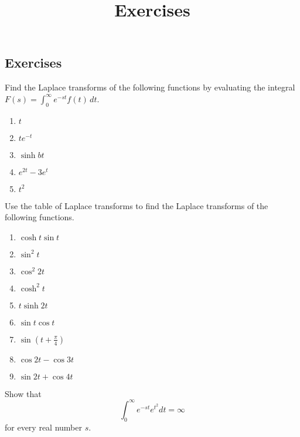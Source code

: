 \documentclass{ximera}
\title{Exercises} \license{CC BY-NC-SA 4.0}
\begin{document}
\begin{abstract}
\end{abstract}
\maketitle

\begin{onlineOnly}
\section*{Exercises}
\end{onlineOnly}


\begin{problem}\label{exer:8.1.1}
Find the Laplace transforms of the following functions by evaluating
the integral $F(s)=\int_0^\infty e^{-st} f(t)\,dt$.

\begin{enumerate}
    \item $t$
    \item $te^{-t}$ 
    \item $\sinh bt$
    \item $e^{2t}-3e^t$
    \item $t^2$
\end{enumerate}
\end{problem}

\begin{problem}\label{exer:8.1.2}
Use  the table of Laplace transforms to
find the Laplace transforms of the following functions.

\begin{enumerate}
    \item $\cosh t\sin t$
    \item $\sin^2t$
    \item $\cos^2 2t$
    \item $\cosh^2 t$
    \item $t\sinh 2t$
    \item $\sin t\cos t$
    \item $\sin\left(t+\frac{\pi}{4}\right)$
    \item $\cos 2t -\cos 3t$
    \item $\sin 2t +\cos 4t$
\end{enumerate}
\end{problem}

\begin{problem}\label{exer:8.1.3}
 Show that
$$
\int_0^\infty e^{-st}e^{t^2} dt=\infty
$$
for every real number $s$.
\end{problem}
\end{document}
